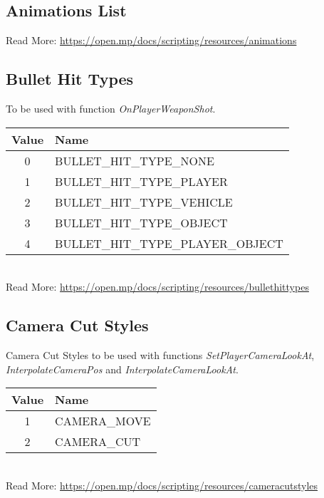 \documentclass{article}
\begin{document}
\subsection{Animations List}
Read More: \url{https://open.mp/docs/scripting/resources/animations}

\subsection{Bullet Hit Types}
To be used with function \textit{OnPlayerWeaponShot}.
\bigskip
\\\begin{tabular}{ |c|l| } 
\hline
Value & Name \\
\hline
0 & BULLET\_HIT\_TYPE\_NONE \\
1 & BULLET\_HIT\_TYPE\_PLAYER \\
2 & BULLET\_HIT\_TYPE\_VEHICLE \\
3 & BULLET\_HIT\_TYPE\_OBJECT \\
4 & BULLET\_HIT\_TYPE\_PLAYER\_OBJECT \\
\hline
\end{tabular}
\bigskip
\\Read More: \url{https://open.mp/docs/scripting/resources/bullethittypes}

\subsection{Camera Cut Styles}
Camera Cut Styles to be used with functions \textit{SetPlayerCameraLookAt}, \textit{InterpolateCameraPos} and \textit{InterpolateCameraLookAt}.
\bigskip
\\\begin{tabular}{ |c|l| } 
\hline
Value & Name \\
\hline
1 & CAMERA\_MOVE \\ 
2 & CAMERA\_CUT \\ 
\hline
\end{tabular}
\bigskip
\\Read More: \url{https://open.mp/docs/scripting/resources/cameracutstyles}
\end{document}
